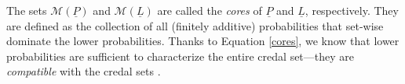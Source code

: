 \documentclass[12pt, english, oneside, a4paper]{article}
\newtheorem{lemma}[theorem]{Lemma}
\begin{document}


The sets $\mathcal{M}(\underline{P})$ and $\mathcal{M}(\underline{L})$ are called the {\em cores} of $\underline{P}$ and $\underline{L}$, respectively. They are defined as the collection of all (finitely additive) probabilities that set-wise dominate the lower probabilities. Thanks to Equation \eqref{cores}, we know that lower probabilities are sufficient to characterize the entire credal set---they are {\em compatible} with the credal sets \citep{gong}. 
\end{document}
